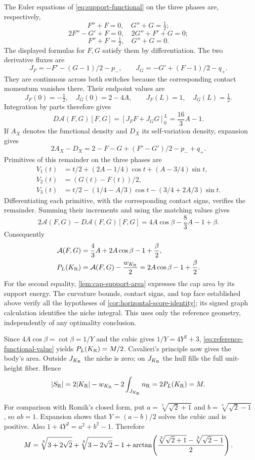 The Euler equations of \cref{eq:support-functional} on the three
phases are, respectively,
\[
 F''+F=0,\quad G''+G=\tfrac12;
\]
\[
 2F''-G'+F=0,\quad 2G''+F'+G=0;
\]
\[
 F''+F=\tfrac12,\quad G''+G=0.
\]
The displayed formulas for $F,G$ satisfy them by differentiation.
The two derivative fluxes are
\[
 J_F=-F'-(G-1)/2-p_-,\qquad
 J_G=-G'+(F-1)/2-q_+.
\]
They are continuous across both switches because the corresponding
contact momentum vanishes there. Their endpoint values are
\[
 J_F(0)=-\tfrac12,\quad J_G(0)=2-4A,
 \qquad J_F(L)=1,\quad J_G(L)=\tfrac12.
\]
Integration by parts therefore gives
\[
 D\mathcal A(F,G)[F,G]
   =[J_FF+J_GG]_0^L=\frac{16}3A-1.
\]
If $A_X$ denotes the functional density and $D_X$ its
self-variation density, expansion gives
\[
 2A_X-D_X=2-F-G+(F'-G')/2-p_-+q_+.
\]
Primitives of this remainder on the three phases are
\begin{align*}
 V_1(t)&=t/2+(2A-1/4)\cos t+(A-3/4)\sin t,\\
 V_2(t)&=(G(t)-F(t))/2,\\
 V_3(t)&=t/2-(1/4-A/3)\cos t-(3/4+2A/3)\sin t.
\end{align*}
Differentiating each primitive, with the corresponding contact
signs, verifies the remainder. Summing their increments and using
the matching values gives
\[
 2\mathcal A(F,G)-D\mathcal A(F,G)[F,G]
       =4A\cos\beta-\frac83A-1+\beta.
\]
Consequently
\begin{equation}\label{eq:reference-functional-value}
 \begin{aligned}
 \mathcal A(F,G)&=\frac43A+2A\cos\beta-1+\frac\beta2,\\
 P_L(K_{\mathrm R})&=\mathcal A(F,G)-\frac{w_{K_{\mathrm R}}}2
          =2A\cos\beta-1+\frac\beta2.
 \end{aligned}
\end{equation}
For the second equality, \cref{lem:cap-support-area} expresses
the cap area by its support energy. The curvature bounds,
contact signs, and top face established above verify all the
hypotheses of \cref{cor:horizontal-score-identity}; its signed
graph calculation identifies the niche integral. This uses only
the reference geometry, independently of any optimality conclusion.

Since $4A\cos\beta=\cot\beta=1/Y$ and the cubic gives
$1/Y=4Y^2+3$, \cref{eq:reference-functional-value} yields
$P_L(K_{\mathrm R})=M/2$. Cavalieri's principle now gives the body's area.
Outside $J_{K_{\mathrm R}}$ the niche is zero; on $J_{K_{\mathrm R}}$ the hull fills
the full unit-height fiber. Hence
\[
 \lvert S_{\mathrm R}\rvert
  =2\lvert K_{\mathrm R}\rvert-w_{K_{\mathrm R}}-2\int_{J_{K_{\mathrm R}}}n_{\mathrm R}
  =2P_L(K_{\mathrm R})=M.
\]


For comparison with Romik's closed form, put
$a=\sqrt[3]{\sqrt2+1}$ and $b=\sqrt[3]{\sqrt2-1}$, so $ab=1$.
Expansion shows that $Y=(a-b)/2$ solves the cubic and is positive.
Also
$1+4Y^2=a^2+b^2-1$. Therefore
\begin{equation}\label{eq:romik-radicals}
 M=\sqrt[3]{3+2\sqrt2}+\sqrt[3]{3-2\sqrt2}-1
       +\arctan\!\left(\frac{\sqrt[3]{\sqrt2+1}
                            -\sqrt[3]{\sqrt2-1}}2\right).
\end{equation}
